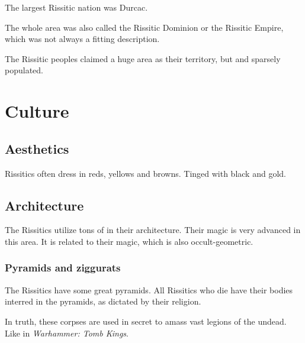 The largest Rissitic nation was Durcac. 

The whole area was also called the Rissitic Dominion or the Rissitic Empire, which was not always a fitting description.

The Rissitic peoples claimed a huge area as their territory, but  and sparsely populated. 















\section{Culture}









\subsection{Aesthetics}
Rissitics often dress in reds, yellows and browns. 
Tinged with black and gold.









\subsection{Architecture}
The Rissitics utilize tons of  in their architecture. 
Their magic is very advanced in this area. 
It is related to their  magic, which is also occult-geometric. 





\subsubsection{Pyramids and ziggurats}
The Rissitics have some great pyramids. All Rissitics who die have their bodies interred in the pyramids, as dictated by their religion. 

In truth, these corpses are used in secret to amass vast legions of the undead. Like in \emph{Warhammer: Tomb Kings}. 









